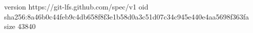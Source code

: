version https://git-lfs.github.com/spec/v1
oid sha256:8a46b0c44feb9c4db658f8f3e1b58d0a3c51d07c34c945e440e4aa5698f363fa
size 43840
